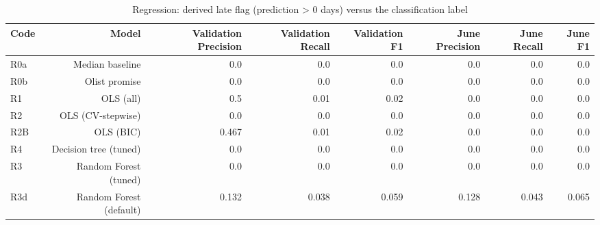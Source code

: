 \begin{table}[htbp]
\centering
\small
\caption{Regression: derived late flag (prediction > 0 days) versus the classification label}
\begin{tabular}{lrrrrrrr}
\toprule
Code & Model & Validation Precision & Validation Recall & Validation F1 & June Precision & June Recall & June F1 \\
\midrule
R0a & Median baseline & 0.0 & 0.0 & 0.0 & 0.0 & 0.0 & 0.0 \\
R0b & Olist promise & 0.0 & 0.0 & 0.0 & 0.0 & 0.0 & 0.0 \\
R1 & OLS (all) & 0.5 & 0.01 & 0.02 & 0.0 & 0.0 & 0.0 \\
R2 & OLS (CV-stepwise) & 0.0 & 0.0 & 0.0 & 0.0 & 0.0 & 0.0 \\
R2B & OLS (BIC) & 0.467 & 0.01 & 0.02 & 0.0 & 0.0 & 0.0 \\
R4 & Decision tree (tuned) & 0.0 & 0.0 & 0.0 & 0.0 & 0.0 & 0.0 \\
R3 & Random Forest (tuned) & 0.0 & 0.0 & 0.0 & 0.0 & 0.0 & 0.0 \\
R3d & Random Forest (default) & 0.132 & 0.038 & 0.059 & 0.128 & 0.043 & 0.065 \\
\bottomrule
\end{tabular}
\par\smallskip\begin{minipage}{\linewidth}\footnotesize \end{minipage}
\end{table}

